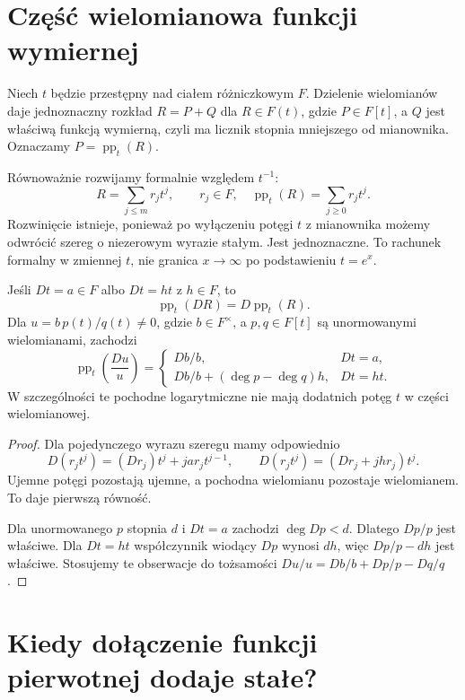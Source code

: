 \section{Część wielomianowa funkcji wymiernej}

Niech $t$ będzie przestępny nad ciałem różniczkowym $F$. Dzielenie wielomianów daje jednoznaczny rozkład $R=P+Q$ dla $R\in F(t)$, gdzie $P\in F[t]$, a $Q$ jest właściwą funkcją wymierną, czyli ma licznik stopnia mniejszego od mianownika. Oznaczamy $P=\operatorname{pp}_t(R)$.

Równoważnie rozwijamy formalnie względem $t^{-1}$:
\[
R=\sum_{j\le m}r_jt^j,\qquad r_j\in F,\quad
\operatorname{pp}_t(R)=\sum_{j\ge0}r_jt^j.
\]
Rozwinięcie istnieje, ponieważ po wyłączeniu potęgi $t$ z mianownika możemy odwrócić szereg o niezerowym wyrazie stałym. Jest jednoznaczne. To rachunek formalny w zmiennej $t$, nie granica $x\to\infty$ po podstawieniu $t=e^x$.

\begin{lemat}
Jeśli $Dt=a\in F$ albo $Dt=ht$ z $h\in F$, to
\[
\operatorname{pp}_t(DR)=D\operatorname{pp}_t(R).
\]
Dla $u=b\,p(t)/q(t)\ne0$, gdzie $b\in F^\times$, a $p,q\in F[t]$ są unormowanymi wielomianami, zachodzi
\[
\operatorname{pp}_t\left(\frac{Du}{u}\right)=
\begin{cases}
Db/b, & Dt=a,\\
Db/b+(\deg p-\deg q)h, & Dt=ht.
\end{cases}
\]
W szczególności te pochodne logarytmiczne nie mają dodatnich potęg $t$ w części wielomianowej.
\end{lemat}
\begin{proof}
Dla pojedynczego wyrazu szeregu mamy odpowiednio
\[
D(r_jt^j)=(Dr_j)t^j+j a r_jt^{j-1},\qquad
D(r_jt^j)=(Dr_j+jhr_j)t^j.
\]
Ujemne potęgi pozostają ujemne, a pochodna wielomianu pozostaje wielomianem. To daje pierwszą równość.

Dla unormowanego $p$ stopnia $d$ i $Dt=a$ zachodzi $\deg Dp<d$. Dlatego $Dp/p$ jest właściwe. Dla $Dt=ht$ współczynnik wiodący $Dp$ wynosi $dh$, więc $Dp/p-dh$ jest właściwe. Stosujemy te obserwacje do tożsamości $Du/u=Db/b+Dp/p-Dq/q$.
\end{proof}

\section{Kiedy dołączenie funkcji pierwotnej dodaje stałe?}

